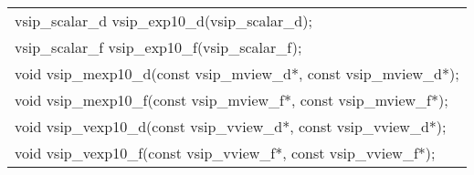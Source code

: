 \\\cvsiplh
\afh
\\\hspace*{.04\textwidth} {
\ttfamily
\begin{tabular}[H]{l}
vsip\_scalar\_d vsip\_exp10\_d(vsip\_scalar\_d);\\
vsip\_scalar\_f vsip\_exp10\_f(vsip\_scalar\_f);\\
void vsip\_mexp10\_d(const vsip\_mview\_d*, const vsip\_mview\_d*);\\
void vsip\_mexp10\_f(const vsip\_mview\_f*, const vsip\_mview\_f*);\\
void vsip\_vexp10\_d(const vsip\_vview\_d*, const vsip\_vview\_d*);\\
void vsip\_vexp10\_f(const vsip\_vview\_f*, const vsip\_vview\_f*);\\
\end{tabular}
}
\\\pyjvsiph
{}
